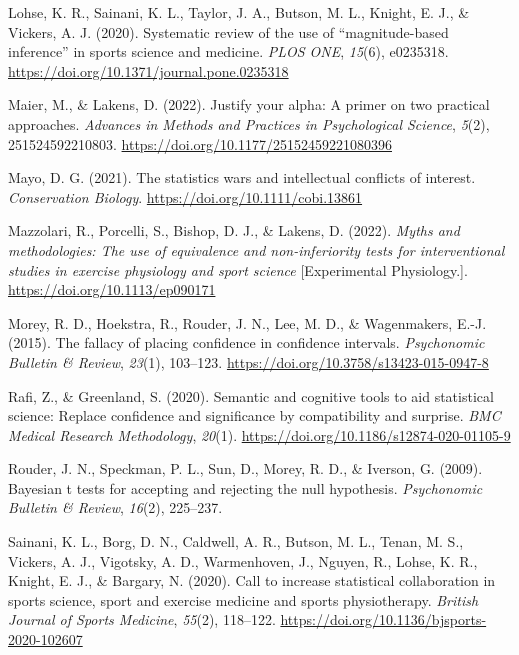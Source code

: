 \documentclass[]{cik}%
\newlength{\cslhangindent}
\newlength{\cslentryspacingunit} %
\newenvironment{CSLReferences}[2] %
 {%
  \setlength{\parindent}{0pt}
  \ifodd #1
  \let\oldpar\par
  \def\par{\hangindent=\cslhangindent\oldpar}
  \fi
  \setlength{\parskip}{#2\cslentryspacingunit}
 }%
 {}
\begin{document}
\begin{CSLReferences}{1}{0}
\leavevmode{}%
Lohse, K. R., Sainani, K. L., Taylor, J. A., Butson, M. L., Knight, E.
J., \& Vickers, A. J. (2020). Systematic review of the use of
{``magnitude-based inference''} in sports science and medicine.
\emph{PLOS ONE}, \emph{15}(6), e0235318.
\url{https://doi.org/10.1371/journal.pone.0235318}

\leavevmode{}%
Maier, M., \& Lakens, D. (2022). Justify your alpha: A primer on two
practical approaches. \emph{Advances in Methods and Practices in
Psychological Science}, \emph{5}(2), 251524592210803.
\url{https://doi.org/10.1177/25152459221080396}

\leavevmode{}%
Mayo, D. G. (2021). The statistics wars and intellectual conflicts of
interest. \emph{Conservation Biology}.
\url{https://doi.org/10.1111/cobi.13861}

\leavevmode{}%
Mazzolari, R., Porcelli, S., Bishop, D. J., \& Lakens, D. (2022).
\emph{Myths and methodologies: The use of equivalence and
non-inferiority tests for interventional studies in exercise physiology
and sport science} {[}Experimental Physiology.{]}.
\url{https://doi.org/10.1113/ep090171}

\leavevmode{}%
Morey, R. D., Hoekstra, R., Rouder, J. N., Lee, M. D., \& Wagenmakers,
E.-J. (2015). The fallacy of placing confidence in confidence intervals.
\emph{Psychonomic Bulletin \& Review}, \emph{23}(1), 103--123.
\url{https://doi.org/10.3758/s13423-015-0947-8}

\leavevmode{}%
Rafi, Z., \& Greenland, S. (2020). Semantic and cognitive tools to aid
statistical science: Replace confidence and significance by
compatibility and surprise. \emph{BMC Medical Research Methodology},
\emph{20}(1). \url{https://doi.org/10.1186/s12874-020-01105-9}

\leavevmode{}%
Rouder, J. N., Speckman, P. L., Sun, D., Morey, R. D., \& Iverson, G.
(2009). Bayesian t tests for accepting and rejecting the null
hypothesis. \emph{Psychonomic Bulletin \& Review}, \emph{16}(2),
225--237.

\leavevmode{}%
Sainani, K. L., Borg, D. N., Caldwell, A. R., Butson, M. L., Tenan, M.
S., Vickers, A. J., Vigotsky, A. D., Warmenhoven, J., Nguyen, R., Lohse,
K. R., Knight, E. J., \& Bargary, N. (2020). Call to increase
statistical collaboration in sports science, sport and exercise medicine
and sports physiotherapy. \emph{British Journal of Sports Medicine},
\emph{55}(2), 118--122.
\url{https://doi.org/10.1136/bjsports-2020-102607}


\end{CSLReferences}
\end{document}
